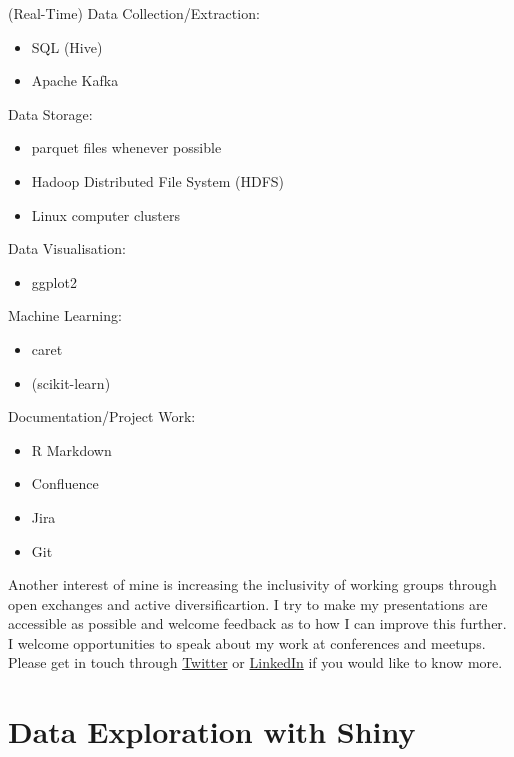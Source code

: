 \documentclass[]{book}
\providecommand{\tightlist}{%
  \setlength{\itemsep}{0pt}\setlength{\parskip}{0pt}}
\begin{document}
(Real-Time) Data Collection/Extraction:

\begin{itemize}
\tightlist
\item
  SQL (Hive)
\item
  Apache Kafka
\end{itemize}

Data Storage:

\begin{itemize}
\tightlist
\item
  parquet files whenever possible
\item
  Hadoop Distributed File System (HDFS)
\item
  Linux computer clusters
\end{itemize}

Data Visualisation:

\begin{itemize}
\tightlist
\item
  ggplot2
\end{itemize}

Machine Learning:

\begin{itemize}
\tightlist
\item
  caret
\item
  (scikit-learn)
\end{itemize}

Documentation/Project Work:

\begin{itemize}
\tightlist
\item
  R Markdown
\item
  Confluence
\item
  Jira
\item
  Git
\end{itemize}

Another interest of mine is increasing the inclusivity of working groups through open exchanges and active diversificartion. I try to make my presentations are accessible as possible and welcome feedback as to how I can improve this further. I welcome opportunities to speak about my work at conferences and meetups. Please get in touch through \href{https://twitter.com/jill_augustine}{Twitter} or \href{https://www.linkedin.com/in/jillianaugustine/}{LinkedIn} if you would like to know more.

\hypertarget{data-exploration-with-shiny}{%
\chapter{Data Exploration with Shiny}\label{data-exploration-with-shiny}}
\end{document}

